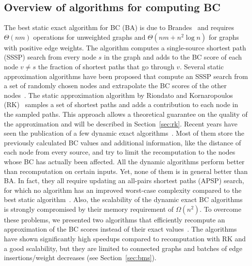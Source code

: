 \documentclass[english]{llncs}
\newcommand{\rk}{\textsf{RK}\xspace}
\begin{document}
\subsection{Overview of algorithms for computing BC}
The best static exact algorithm for BC (\textsf{BA}) is due to Brandes~\cite{Brandes01betweennessCentrality} and requires $\Theta(nm)$ operations for unweighted graphs
and $\Theta(nm+n^{2}\log n)$ for graphs with positive edge weights. The algorithm computes a single-source shortest path (SSSP) search from every node $s$ in the graph and adds to the BC score of each node $v \neq s$ the fraction of shortest paths that go through $v$. Several static approximation algorithms have been proposed that compute an SSSP search from a set of randomly chosen nodes and extrapolate the BC scores of the other nodes~\cite{DBLP:journals/ijbc/BrandesP07,DBLP:conf/alenex/GeisbergerSS08,DBLP:conf/waw/BaderKMM07}. The static approximation algorithm by Riondato and Kornaropoulos (\rk)~\cite{DBLP:conf/wsdm/RiondatoK14} samples a set of shortest paths and adds a contribution to each node in the sampled paths. This approach allows a theoretical guarantee on the quality of the approximation and will be described in Section~\ref{sec:rk}.
Recent years have seen the publication of a few dynamic exact algorithms~\cite{DBLP:conf/www/LeeLPCC12,DBLP:conf/socialcom/GreenMB12,kourtellis2014scalable,DBLP:journals/snam/KasCC14,DBLP:conf/mfcs/NasrePR14,DBLP:conf/waw/GoelSIS13}. Most of them
store the previously calculated BC values and additional information, like the distance
of each node from every source, and try to limit the recomputation to the nodes whose
BC has actually been affected. All the dynamic algorithms perform better than
recomputation on certain inputs. Yet, none of them
is in general better than \textsf{BA}. In fact, they
all require updating an all-pairs shortest paths (APSP) search, for which no algorithm has an improved worst-case complexity compared to the best static algorithm~\cite{DBLP:journals/algorithmica/RodittyZ11}. 
Also, the scalability of the dynamic exact BC algorithms is strongly compromised by their memory requirement of $\Omega (n^2)$. To overcome these problems, we presented two algorithms that efficiently recompute an approximation of the BC scores instead of their exact values~\cite{DBLP:conf/alenex/BergaminiMS15}. 
The algorithms have shown significantly high speedups compared to recomputation with \rk and a good scalability, but they are limited to connected graphs and batches of edge insertions/weight decreases (see Section~\ref{sec:bms}).
\end{document}
